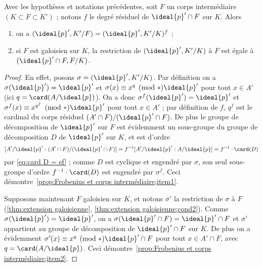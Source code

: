 \documentclass[11pt, %
  title in boldface,
  theorem in new line,
  theorem numbering = section,
  number theorems separately,
  simple name,
]{beaulivre}
\begin{document}
    \begin{proposition}\label{prop:Frobenius et corps intermédiaire}
        Avec les hypothèses et notations précédentes, soit \( F \) un corps intermédiaire \( (K \subset F \subset K') \) ; notons \( f \) le degré résiduel de \( \ideal{p}' \cap F \) sur \( K \). Alors
        \begin{enumerate}
            \item \label{prop:Frobenius et corps intermédiaire;item1} on a \( (\ideal{p}',K'/F) = (\ideal{p}',K'/K)^f \) ;
            \item \label{prop:Frobenius et corps intermédiaire;item2} si \( F \) est galoisien sur \( K \), la restriction de \( (\ideal{p}',K'/K) \) à \( F \) est égale à \( (\ideal{p}' \cap F, F/K) \).
        \end{enumerate}
    \end{proposition}
    \begin{proof}
        En effet, posons \( \sigma = (\ideal{p}',K'/K) \). Par définition on a \( \sigma(\ideal{p}') = \ideal{p}' \) et \( \sigma(x) \equiv x^q \pmod*{\ideal{p}'} \) pour tout \( x \in A' \) (ici \( q = \card(A/\ideal{p}) \)). On a donc \( \sigma^f(\ideal{p}') = \ideal{p}' \) et \( \sigma^f(x) \equiv x^{q^f} \pmod*{\ideal{p}'} \) pour tout \( x \in A' \) ; par définition de \( f \), \( q^f \) est le cardinal du corps résiduel \( (A' \cap F)/(\ideal{p}' \cap F) \). De plus le groupe de décomposition de \( \ideal{p}' \) sur \( F \) est évidemment un sous-groupe du groupe de décomposition \( D \) de \( \ideal{p}' \) sur \( K \), et est d'ordre
        \[
            [ A'/\ideal{p}' : (A' \cap F)/(\ideal{p}' \cap F) ] = f^{-1}[ A'/\ideal{p}' : A/\ideal{p} ] = f^{-1} \cdot \card(D)
        \]
        par \eqref{eq:card D = ef} ; comme \( D \) est cyclique et engendré par \( \sigma \), son seul sous-groupe d'ordre \( f^{-1} \cdot \card(D) \) est engendré par \( \sigma^f \). Ceci démontre~\ref{prop:Frobenius et corps intermédiaire;item1}.

        Supposons maintenant \( F \) galoisien sur \( K \), et notons \( \sigma' \) la restriction de \( \sigma \) à \( F \) (\cref{thm:extension galoisienne}, \ref{thm:extension galoisienne;cond2}). Comme \( \sigma(\ideal{p}') = \ideal{p}' \), on a \( \sigma(\ideal{p}' \cap F) = \ideal{p}' \cap F \) et \( \sigma' \) appartient au groupe de décomposition de \( \ideal{p}' \cap F \) sur \( K \). De plus on a évidemment \( \sigma'(x) \equiv x^q \pmod*{\ideal{p}' \cap F} \) pour tout \( x \in A' \cap F \), avec \( q = \card(A/\ideal{p}) \). Ceci démontre~\ref{prop:Frobenius et corps intermédiaire;item2}.
    \end{proof}
\end{document}

